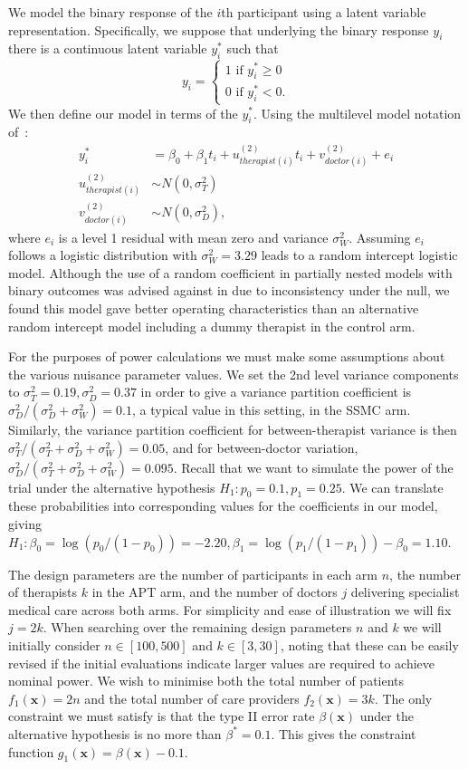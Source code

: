 \documentclass[]{sagej}
\begin{document}
We model the binary response of the $i$th participant using a latent variable representation. Specifically, we suppose that underlying the binary response $y_i$ there is a continuous latent variable $y_i^*$ such that
$$
y_i =
\begin{cases}
1 \text{ if } y_i^* \geq 0\\
0 \text{ if } y_i^* < 0.
\end{cases}
$$
We then define our model in terms of the $y_i^*$. Using the multilevel model notation of~\cite{Goldstein2003}:
\begin{align}\label{eqn:ex1_model}
y_i^* &= \beta_{0} + \beta_1 t_i + u_{therapist(i)}^{(2)}t_{i} + v_{doctor(i)}^{(2)} + e_i \\
u_{therapist(i)}^{(2)} & \sim N(0, \sigma_T^2) \\
v_{doctor(i)}^{(2)} & \sim N(0, \sigma_D^2),
\end{align}
where $e_i$ is a level 1 residual with mean zero and variance $\sigma_W^2$. Assuming $e_i$ follows a logistic distribution with $\sigma_W^2 = 3.29$ leads to a random intercept logistic model. Although the use of a random coefficient in partially nested models with binary outcomes was advised against in \cite{Roberts2015} due to inconsistency under the null, we found this model gave better operating characteristics than an alternative random intercept model including a dummy therapist in the control arm. 

For the purposes of power calculations we must make some assumptions about the various nuisance parameter values. We set the 2nd level variance components to $\sigma_{T}^{2} = 0.19, \sigma_{D}^{2} = 0.37$ in order to give a variance partition coefficient is $\sigma_D^2 / (\sigma^2_D + \sigma^2_W) = 0.1$, a typical value in this setting, in the SSMC arm. Similarly, the variance partition coefficient for between-therapist variance is then $\sigma^2_T/(\sigma^2_T + \sigma^2_D + \sigma^2_W) = 0.05$, and for between-doctor variation, $\sigma^2_D/(\sigma^2_T + \sigma^2_D + \sigma^2_W) = 0.095$. Recall that we want to simulate the power of the trial under the alternative hypothesis $H_1: p_0=0.1, p_1=0.25$. We can translate these probabilities into corresponding values for the coefficients in our model, giving $H_1: \beta_0 = \log(p_0/(1-p_0)) = -2.20, \beta_1 = \log(p_1/(1-p_1)) - \beta_0 = 1.10$.

The design parameters are the number of participants in each arm $n$, the number of therapists $k$ in the APT arm, and the number of doctors $j$ delivering specialist medical care across both arms. For simplicity and ease of illustration we will fix $j = 2k$. When searching over the remaining design parameters $n$ and $k$ we will initially consider $n \in [100, 500]$ and $k \in [3, 30]$, noting that these can be easily revised if the initial evaluations indicate larger values are required to achieve nominal power. We wish to minimise both the total number of patients $f_{1}(\mathbf{x}) = 2n$ and the total number of care providers $f_{2}(\mathbf{x}) = 3k$. The only constraint we must satisfy is that the type II error rate $\beta(\mathbf{x})$ under the alternative hypothesis is no more than $\beta^{*} = 0.1$. This gives the constraint function $g_{1}(\mathbf{x}) = \beta(\mathbf{x}) - 0.1$.
\end{document}
